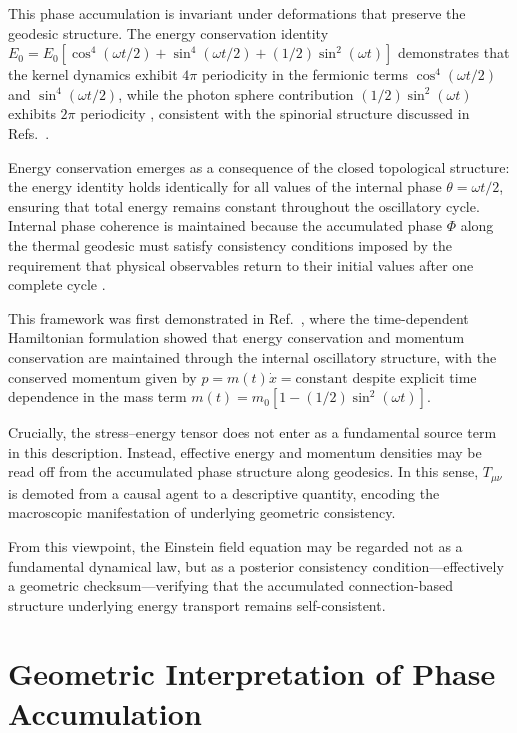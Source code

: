 \documentclass[%
 reprint,
 amsmath,amssymb,
 aps,
 prb,
]{revtex4-2}
\numberwithin{equation}{section}
\begin{document}
This phase accumulation is invariant under deformations that preserve the geodesic structure. The energy conservation identity $E_0 = E_0[\cos^4(\omega t/2) + \sin^4(\omega t/2) + (1/2)\sin^2(\omega t)]$ demonstrates that the kernel dynamics exhibit $4\pi$ periodicity in the fermionic terms $\cos^4(\omega t/2)$ and $\sin^4(\omega t/2)$, while the photon sphere contribution $(1/2)\sin^2(\omega t)$ exhibits $2\pi$ periodicity \cite{hanamura17982104,hanamura17765136}, consistent with the spinorial structure discussed in Refs.~\cite{Sakurai,Nakahara}.

Energy conservation emerges as a consequence of the closed topological structure: the energy identity holds identically for all values of the internal phase $\theta = \omega t/2$, ensuring that total energy remains constant throughout the oscillatory cycle. Internal phase coherence is maintained because the accumulated phase $\Phi$ along the thermal geodesic must satisfy consistency conditions imposed by the requirement that physical observables return to their initial values after one complete cycle \cite{hanamura17765244}.

This framework was first demonstrated in Ref.~\cite{hanamura17765200}, where the time-dependent Hamiltonian formulation showed that energy conservation and momentum conservation are maintained through the internal oscillatory structure, with the conserved momentum given by $p = m(t)\dot{x} = \text{constant}$ despite explicit time dependence in the mass term $m(t) = m_0[1 - (1/2)\sin^2(\omega t)]$.

Crucially, the stress--energy tensor does not enter as a fundamental source term in this description. Instead, effective energy and momentum densities may be read off from the accumulated phase structure along geodesics. In this sense, $T_{\mu\nu}$ is demoted from a causal agent to a descriptive quantity, encoding the macroscopic manifestation of underlying geometric consistency.

From this viewpoint, the Einstein field equation may be regarded not as a fundamental dynamical law, but as a posterior consistency condition---effectively a geometric checksum---verifying that the accumulated connection-based structure underlying energy transport remains self-consistent.

\section{Geometric Interpretation of Phase Accumulation}
\label{sec:phase_interpretation}
\end{document}
